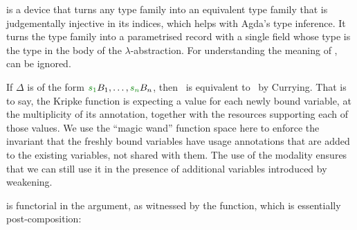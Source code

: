 




is a device that turns any type family into an equivalent type family
that is judgementally injective in its indices, which helps with
Agda's type inference.
It turns the type family into a parametrised
record with a single field  whose type is the type in
the body of the $\lambda$-abstraction.
For understanding the meaning of
,  can be ignored.

If $\Delta$ is of the form $\gr{s_1}B_1, \ldots, \gr{s_n}B_n$, then
\ is equivalent to
\ by Currying.  That is
to say, the Kripke function is expecting a value for each newly bound
variable, at the multiplicity of its annotation, together with the
resources supporting each of those values. We use the ``magic wand''
function space here to enforce the invariant that the freshly bound
variables have usage annotations that are added to the existing
variables, not shared with them. The use of the
 modality ensures that we can still use it in
the presence of additional variables introduced by weakening.

 is functorial in the \AgdaBound{$\C$} argument,
as witnessed by the  function, which is essentially
post-composition:



